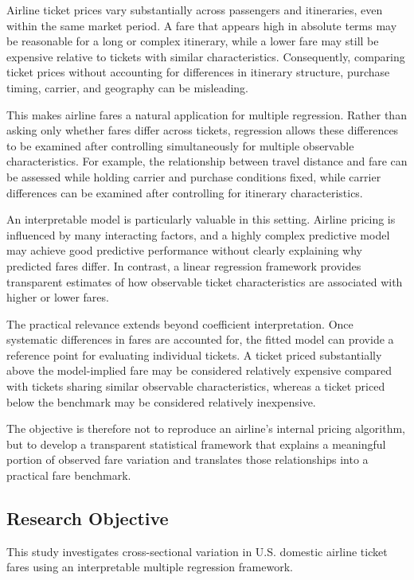 \documentclass[11pt,a4paper]{article}
\begin{document}
Airline ticket prices vary substantially across passengers and itineraries, even within the same market period. A fare that appears high in absolute terms may be reasonable for a long or complex itinerary, while a lower fare may still be expensive relative to tickets with similar characteristics. Consequently, comparing ticket prices without accounting for differences in itinerary structure, purchase timing, carrier, and geography can be misleading.

This makes airline fares a natural application for multiple regression. Rather than asking only whether fares differ across tickets, regression allows these differences to be examined after controlling simultaneously for multiple observable characteristics. For example, the relationship between travel distance and fare can be assessed while holding carrier and purchase conditions fixed, while carrier differences can be examined after controlling for itinerary characteristics.

An interpretable model is particularly valuable in this setting. Airline pricing is influenced by many interacting factors, and a highly complex predictive model may achieve good predictive performance without clearly explaining why predicted fares differ. In contrast, a linear regression framework provides transparent estimates of how observable ticket characteristics are associated with higher or lower fares.

The practical relevance extends beyond coefficient interpretation. Once systematic differences in fares are accounted for, the fitted model can provide a reference point for evaluating individual tickets. A ticket priced substantially above the model-implied fare may be considered relatively expensive compared with tickets sharing similar observable characteristics, whereas a ticket priced below the benchmark may be considered relatively inexpensive.

The objective is therefore not to reproduce an airline's internal pricing algorithm, but to develop a transparent statistical framework that explains a meaningful portion of observed fare variation and translates those relationships into a practical fare benchmark.

\subsection{Research Objective}

This study investigates cross-sectional variation in U.S. domestic airline ticket fares using an interpretable multiple regression framework.
\end{document}
